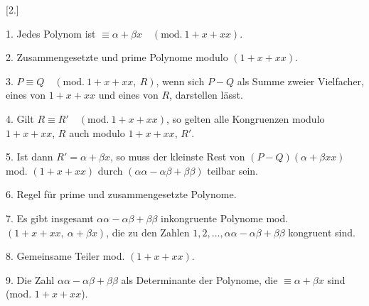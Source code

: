 \clearpage{}
\begin{center}\end{center}
\begin{center}[2.]\end{center}
\noindent\hspace*{\parindent}1. Jedes Polynom ist $\equiv \alpha+\beta x \quad(\mathrm{mod.}\ 1+x+xx)$.

2. Zusammengesetzte und prime Polynome modulo $(1+x+xx)$.

3. $P \equiv Q \quad(\mathrm{mod.}\ 1+x+xx,\ R)$,
wenn sich $P-Q$ als Summe zweier Vielfacher, eines von $1+x+xx$ und eines von $R$, darstellen lässt.

4. Gilt $R \equiv R' \quad(\mathrm{mod.}\ 1+x+xx)$, so gelten alle Kongruenzen modulo
$1+x+xx$, $R$ auch modulo $1+x+xx$, $R'$.

5. Ist dann $R' = \alpha+\beta x$, so muss der kleinste Rest von
$(P-Q)(\alpha+\beta xx)$ mod. $(1+x+xx)$ durch
$(\alpha\alpha-\alpha\beta+\beta\beta)$ teilbar sein.

6. Regel für prime und zusammengesetzte Polynome.

7. Es gibt insgesamt $\alpha\alpha-\alpha\beta+\beta\beta$ inkongruente
Polynome mod. $(1+x+xx,\ \alpha+\beta x)$, die zu den Zahlen $1, 2, \ldots,
\alpha\alpha-\alpha\beta+\beta\beta$ kongruent sind.

8. Gemeinsame Teiler mod. $(1+x+xx)$.

9. Die Zahl $\alpha\alpha-\alpha\beta+\beta\beta$ als Determinante der Polynome,
die $\equiv \alpha+\beta x$ sind (mod. $1+x+xx$).

